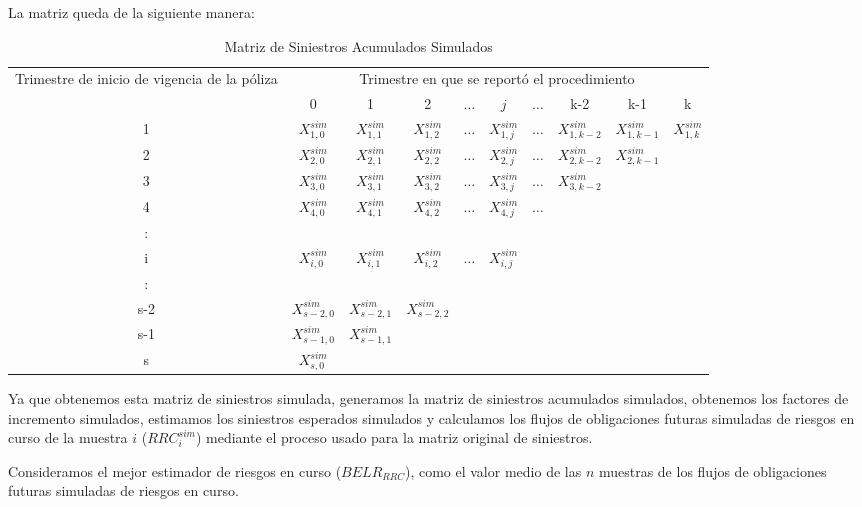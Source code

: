 \documentclass[11pt,twoside,openright,spanish]{report}
\numberwithin{equation}{chapter}
\numberwithin{figure}{chapter}
\numberwithin{table}{chapter}
\begin{document}
	La matriz queda de la siguiente manera:
	
	\begin{table}[H]
		\centering
		\caption{Matriz de Siniestros Acumulados Simulados}
		\begin{tabularx}{\linewidth}{ c|ccccccccc}
			\multirow{2}{4cm}{Trimestre de inicio de vigencia de la póliza}& \multicolumn{9}{c}{Trimestre en que se reportó el procedimiento} \\
			& 0  & 1 & 2 & $ \dots $ & $j$ & $\dots $ & k-2 & k-1 &  k \\
			\midrule
			1      &  $X_{1,0}^{sim}$ & $X_{1,1}^{sim}$ & $X_{1,2}^{sim}$ & $ \dots $ & $X_{1,j}^{sim}$ & $ \dots $ & $X_{1,k-2}^{sim}$ & $X_{1,k-1}^{sim}$ & $X_{1,k}^{sim}$ \\
			2      &  $X_{2,0}^{sim}$ & $X_{2,1}^{sim}$ & $X_{2,2}^{sim}$ & $ \dots $ & $X_{2,j}^{sim}$ & $ \dots $ & $X_{2,k-2}^{sim}$ & $X_{2,k-1}^{sim}$ & \\
			3      &  $X_{3,0}^{sim}$ & $X_{3,1}^{sim}$ & $X_{3,2}^{sim}$ & $ \dots $ & $X_{3,j}^{sim}$ & $ \dots $ & $X_{3,k-2}^{sim}$ & & \\
			4      &  $X_{4,0}^{sim}$ & $X_{4,1}^{sim}$ & $X_{4,2}^{sim}$ & $ \dots $ & $X_{4,j}^{sim}$ & $ \dots $ & & & \\
			:      & & & & & & & & &\\
			i      &  $X_{i,0}^{sim}$ & $X_{i,1}^{sim}$ & $X_{i,2}^{sim}$ & $ \dots $ & $X_{i,j}^{sim}$ & & & & \\
			:      & & & & & & & & & \\
			s-2      &  $X_{s-2,0}^{sim}$ & $X_{s-2,1}^{sim}$ & $X_{s-2,2}^{sim}$ & & & & & & \\
			s-1      &  $X_{s-1,0}^{sim}$ & $X_{s-1,1}^{sim}$ & & & & & & & \\
			s      &  $X_{s,0}^{sim}$ & & & & & & & & \\
		\end{tabularx}
	\end{table}

Ya que obtenemos esta matriz de siniestros simulada, generamos la matriz de siniestros acumulados simulados, obtenemos los factores de incremento simulados, estimamos los siniestros esperados simulados y calculamos los flujos de obligaciones futuras simuladas de riesgos en curso de la muestra $i$ ($RRC_{i}^{sim}$) mediante el proceso usado para la matriz original de siniestros.
	
	 
	
	Consideramos el mejor estimador de riesgos en curso ($BELR_{RRC}$), como el valor medio de las $n$ muestras de los flujos de obligaciones futuras simuladas de riesgos en curso.
\end{document}
